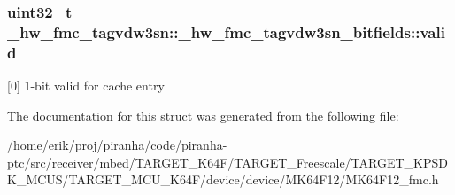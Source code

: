 \subsubsection[{\texorpdfstring{valid}{valid}}]{\setlength{\rightskip}{0pt plus 5cm}uint32\+\_\+t \+\_\+hw\+\_\+fmc\+\_\+tagvdw3sn\+::\+\_\+hw\+\_\+fmc\+\_\+tagvdw3sn\+\_\+bitfields\+::valid}\hypertarget{struct__hw__fmc__tagvdw3sn_1_1__hw__fmc__tagvdw3sn__bitfields_abb2367f8d72c81b9c47a82f7b8381187}{}\label{struct__hw__fmc__tagvdw3sn_1_1__hw__fmc__tagvdw3sn__bitfields_abb2367f8d72c81b9c47a82f7b8381187}
\mbox{[}0\mbox{]} 1-\/bit valid for cache entry 

The documentation for this struct was generated from the following file\+:\begin{DoxyCompactItemize}
\item 
/home/erik/proj/piranha/code/piranha-\/ptc/src/receiver/mbed/\+T\+A\+R\+G\+E\+T\+\_\+\+K64\+F/\+T\+A\+R\+G\+E\+T\+\_\+\+Freescale/\+T\+A\+R\+G\+E\+T\+\_\+\+K\+P\+S\+D\+K\+\_\+\+M\+C\+U\+S/\+T\+A\+R\+G\+E\+T\+\_\+\+M\+C\+U\+\_\+\+K64\+F/device/device/\+M\+K64\+F12/M\+K64\+F12\+\_\+fmc.\+h\end{DoxyCompactItemize}
